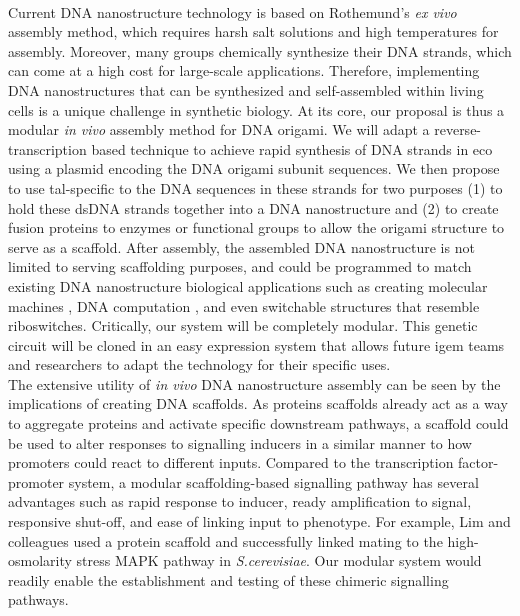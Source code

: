 \documentclass[a4paper]{article}
\begin{document}
\\
Current DNA nanostructure technology is based on Rothemund’s \textit{ex vivo} assembly method, which requires harsh salt solutions and high temperatures for assembly\cite{intro4}.
Moreover, many groups chemically synthesize their DNA strands, which can come at a high cost for large-scale applications.
Therefore, implementing DNA nanostructures that can be synthesized and self-assembled within living cells is a unique challenge in synthetic biology.
At its core, our proposal is thus a modular \textit{in vivo} assembly method for DNA origami.
We will adapt a reverse-transcription based technique to achieve rapid synthesis of DNA strands in \ac{eco} using a plasmid encoding the DNA origami subunit sequences\cite{intro5}.
We then propose to use \ac{tal}-specific to the DNA sequences in these strands for two purposes (1) to hold these dsDNA strands together into a DNA nanostructure and (2) to create fusion proteins to enzymes or functional groups to allow the origami structure to serve as a scaffold.
After assembly, the assembled DNA nanostructure is not limited to serving scaffolding purposes, and could be programmed to match existing DNA nanostructure biological applications such as creating molecular machines \cite{intro6,intro7}, DNA computation \cite{intro8}, and even switchable structures that resemble riboswitches\cite{intro9}.
Critically, our system will be completely modular.
This genetic circuit will be cloned in an easy expression system that allows future \ac{igem} teams and researchers to adapt the technology for their specific uses.
\vspace{2 mm}
\\
The extensive utility of \textit{in vivo} DNA nanostructure assembly can be seen by the implications of creating DNA scaffolds.
As proteins scaffolds already act as a way to aggregate proteins and activate specific downstream pathways, a scaffold could be used to alter responses to signalling inducers in a similar manner to how promoters could react to different inputs\cite{intro11}.
Compared to the transcription factor-promoter system, a modular scaffolding-based signalling pathway has several advantages such as rapid response to inducer, ready amplification to signal, responsive shut-off, and ease of linking input to phenotype.
For example, Lim and colleagues used a protein scaffold and successfully linked mating to the high-osmolarity stress MAPK pathway in \textit{S.cerevisiae}\cite{intro12}.
Our modular system would readily enable the establishment and testing of these chimeric signalling pathways.
\end{document}
